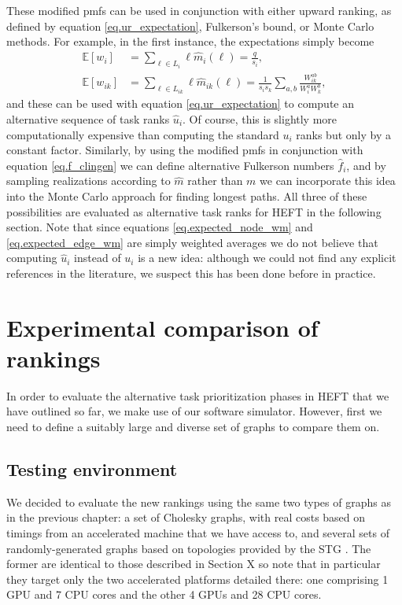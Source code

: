 \documentclass[12pt]{article}
\def\E{\mathbb{E}}
\begin{document}
These modified pmfs can be used in conjunction with either upward ranking, as defined by equation \eqref{eq.ur_expectation}, Fulkerson's bound, or Monte Carlo methods. For example, in the first instance, the expectations simply become 
\begin{align}
\E[w_i] &= \sum_{\ell \in L_i} \ell \hat{m}_i(\ell) = \frac{q}{s_i}, \label{eq.expected_node_wm}\\
\E[w_{ik}] &= \sum_{\ell \in L_{ik}} \ell \hat{m}_{ik}(\ell) = \frac{1}{s_i s_k} \sum_{a, b} \frac{W_{ik}^{ab}}{W_i^a W_k^b} \label{eq.expected_edge_wm},
\end{align}
and these can be used with equation \eqref{eq.ur_expectation} to compute an alternative sequence of task ranks $\hat{u}_i$. Of course, this is slightly more computationally expensive than computing the standard $u_i$ ranks but only by a constant factor. Similarly, by using the modified pmfs in conjunction with equation \eqref{eq.f_clingen} we can define alternative Fulkerson numbers $\hat{f}_i$, and by sampling realizations according to $\hat{m}$ rather than $m$ we can incorporate this idea into the Monte Carlo approach for finding longest paths. All three of these possibilities are evaluated as alternative task ranks for HEFT in the following section. Note that since equations \eqref{eq.expected_node_wm} and \eqref{eq.expected_edge_wm} are simply weighted averages we do not believe that computing $\hat{u}_i$ instead of $u_i$ is a new idea: although we could not find any explicit references in the literature, we suspect this has been done before in practice.  


\section{Experimental comparison of rankings}
\label{sect.experimental_rankings}

In order to evaluate the alternative task prioritization phases in HEFT that we have outlined so far, we make use of our software simulator. However, first we need to define a suitably large and diverse set of graphs to compare them on. 

\subsection{Testing environment}
\label{subsect.graphs}

We decided to evaluate the new rankings using the same two types of graphs as in the previous chapter: a set of Cholesky graphs, with real costs based on timings from an accelerated machine that we have access to, and several sets of randomly-generated graphs based on topologies provided by the STG \cite{tob02}. The former are identical to those described in Section X so note that in particular they target only the two accelerated platforms detailed there: one comprising 1 GPU and 7 CPU cores and the other 4 GPUs and 28 CPU cores.
\end{document}
